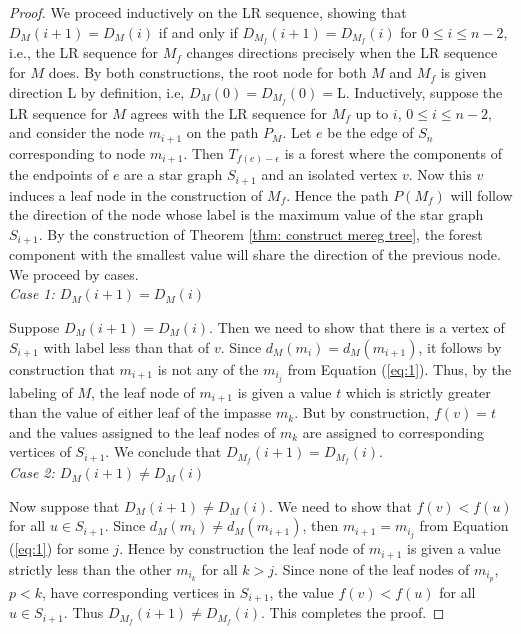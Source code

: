 \documentclass{article}
\theoremstyle{definition}
\newcommand{\ep}    {\epsilon}
\begin{document}
\begin{proof}
We proceed inductively on the LR sequence, showing that $D_M(i+1)=D_M(i)$ if and only if $D_{M_f}(i+1)=D_{M_f}(i)$ for $0\leq i\leq n-2$, i.e., the LR sequence for $M_f$ changes directions precisely when the LR sequence for $M$ does. By both constructions, the root node for both $M$ and $M_f$ is given direction L by definition, i.e, $D_M(0)=D_{M_f}(0)=$L. Inductively, suppose the LR sequence for $M$ agrees with the LR sequence for $M_f$ up to $i$, $0\leq i\leq n-2$, and consider the node $m_{i+1}$ on the path $P_M$. Let $e$ be the edge of $S_n$ corresponding to node $m_{i+1}$.  Then $T_{f(e)-\ep}$ is a forest where the components of the endpoints of $e$ are a star graph $S_{i+1}$ and an isolated vertex $v$. Now this $v$ induces a leaf node in the construction of $M_f$.  Hence the path $P(M_f)$ will follow the direction of the node whose label is the maximum value of the star graph $S_{i+1}$. By the construction of Theorem \ref{thm: construct mereg tree}, the forest component with the smallest value will share the direction of the previous node. We proceed by cases.\\

\noindent \textit{Case 1:  $D_M(i+1)=D_M(i)$}

Suppose $D_M(i+1)=D_M(i)$. Then we need to show that there is a vertex of $S_{i+1}$ with label less than that of $v$. Since $d_M(m_i)=d_M(m_{i+1})$, it follows by construction that $m_{i+1}$ is not any of the $m_{i_j}$ from Equation (\ref{eq:1}). Thus, by the labeling of $M$, the leaf node of $m_{i+1}$ is given a value $t$ which is strictly greater than the value of either leaf of the impasse $m_k$. But by construction, $f(v)=t$ and the values assigned to the leaf nodes of $m_k$ are assigned to corresponding vertices of $S_{i+1}$. We conclude that $D_{M_f}(i+1)=D_{M_f}(i)$. \\

\noindent \textit{Case 2:  $D_M(i+1)\neq D_M(i)$}

Now suppose that $D_M(i+1)\neq D_M(i)$.  We need to show that $f(v)<f(u)$ for all $u\in S_{i+1}$. Since $d_M(m_i)\neq d_M(m_{i+1})$, then $m_{i+1}=m_{i_j}$ from Equation (\ref{eq:1}) for some $j$.  Hence by construction the leaf node of $m_{i+1}$ is given a value strictly less than the other $m_{i_k}$ for all $k>j$.  Since none of the leaf nodes of $m_{i_p}$, $p<k$, have corresponding vertices in $S_{i+1}$, the value $f(v)<f(u)$ for all $u\in S_{i+1}$. Thus $D_{M_f}(i+1)\neq D_{M_f}(i)$.  This completes the proof.



\end{proof}
\end{document}

